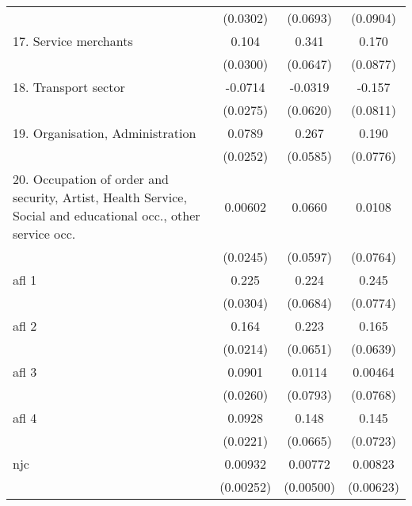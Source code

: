 {\begin{tabular}{l*{3}{c}}
                    &    (0.0302)         &    (0.0693)         &    (0.0904)         \\
[1em]
17. Service merchants&       0.104\sym{***}&       0.341\sym{***}&       0.170         \\
                    &    (0.0300)         &    (0.0647)         &    (0.0877)         \\
[1em]
18. Transport sector&     -0.0714\sym{**} &     -0.0319         &      -0.157         \\
                    &    (0.0275)         &    (0.0620)         &    (0.0811)         \\
[1em]
19. Organisation, Administration&      0.0789\sym{**} &       0.267\sym{***}&       0.190\sym{*}  \\
                    &    (0.0252)         &    (0.0585)         &    (0.0776)         \\
[1em]
20. Occupation of order and security, Artist, Health Service, Social and educational occ., other service occ.&     0.00602         &      0.0660         &      0.0108         \\
                    &    (0.0245)         &    (0.0597)         &    (0.0764)         \\
[1em]
afl 1               &       0.225\sym{***}&       0.224\sym{**} &       0.245\sym{**} \\
                    &    (0.0304)         &    (0.0684)         &    (0.0774)         \\
[1em]
afl 2               &       0.164\sym{***}&       0.223\sym{***}&       0.165\sym{*}  \\
                    &    (0.0214)         &    (0.0651)         &    (0.0639)         \\
[1em]
afl 3               &      0.0901\sym{***}&      0.0114         &     0.00464         \\
                    &    (0.0260)         &    (0.0793)         &    (0.0768)         \\
[1em]
afl 4               &      0.0928\sym{***}&       0.148\sym{*}  &       0.145\sym{*}  \\
                    &    (0.0221)         &    (0.0665)         &    (0.0723)         \\
[1em]
njc                 &     0.00932\sym{***}&     0.00772         &     0.00823         \\
                    &   (0.00252)         &   (0.00500)         &   (0.00623)         \\

\end{tabular}}

